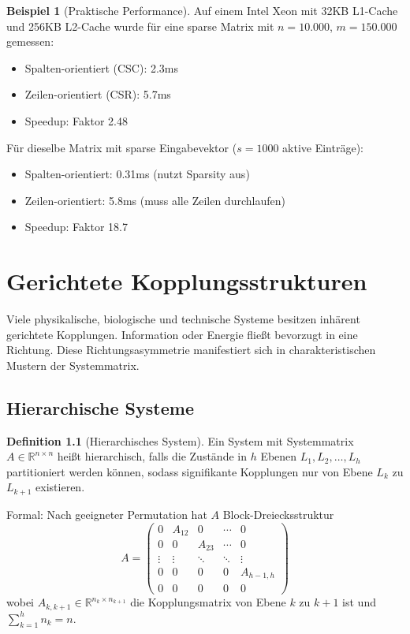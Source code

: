 ﻿\documentclass[a4paper,12pt]{report}
\theoremstyle{definition}
\newtheorem{definition}{Definition}
\newtheorem{beispiel}{Beispiel}
\begin{document}
	\begin{beispiel}[Praktische Performance]
		Auf einem Intel Xeon mit 32KB L1-Cache und 256KB L2-Cache wurde für eine sparse Matrix mit $n = 10.000$, $m = 150.000$ gemessen:
		\begin{itemize}
			\item Spalten-orientiert (CSC): 2.3ms
			\item Zeilen-orientiert (CSR): 5.7ms
			\item Speedup: Faktor 2.48
		\end{itemize}
		
		Für dieselbe Matrix mit sparse Eingabevektor ($s = 1000$ aktive Einträge):
		\begin{itemize}
			\item Spalten-orientiert: 0.31ms (nutzt Sparsity aus)
			\item Zeilen-orientiert: 5.8ms (muss alle Zeilen durchlaufen)
			\item Speedup: Faktor 18.7
		\end{itemize}
	\end{beispiel}
	
	\chapter{Gerichtete Kopplungsstrukturen}
	
	Viele physikalische, biologische und technische Systeme besitzen inhärent gerichtete Kopplungen. Information oder Energie fließt bevorzugt in eine Richtung. Diese Richtungsasymmetrie manifestiert sich in charakteristischen Mustern der Systemmatrix.
	
	\section{Hierarchische Systeme}
	
	\begin{definition}[Hierarchisches System]
		Ein System mit Systemmatrix $A \in \mathbb{R}^{n \times n}$ heißt hierarchisch, falls die Zustände in $h$ Ebenen $L_1, L_2, \ldots, L_h$ partitioniert werden können, sodass signifikante Kopplungen nur von Ebene $L_k$ zu $L_{k+1}$ existieren.
		
		Formal: Nach geeigneter Permutation hat $A$ Block-Dreiecksstruktur
		\[
		A = \begin{pmatrix}
			0 & A_{12} & 0 & \cdots & 0 \\
			0 & 0 & A_{23} & \cdots & 0 \\
			\vdots & \vdots & \ddots & \ddots & \vdots \\
			0 & 0 & 0 & 0 & A_{h-1,h} \\
			0 & 0 & 0 & 0 & 0
		\end{pmatrix}
		\]
		wobei $A_{k,k+1} \in \mathbb{R}^{n_k \times n_{k+1}}$ die Kopplungsmatrix von Ebene $k$ zu $k+1$ ist und $\sum_{k=1}^h n_k = n$.
	\end{definition}
	
\end{document}
